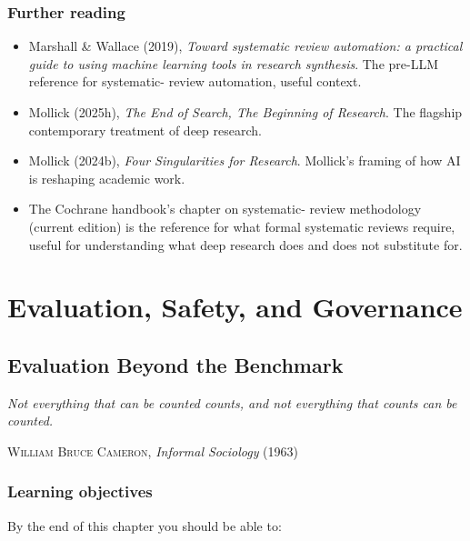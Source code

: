 \documentclass[
  letterpaper,
  11pt]{scrbook}
\providecommand{\tightlist}{%
  \setlength{\itemsep}{0pt}\setlength{\parskip}{0pt}}
\begin{document}
\section{Further reading}\label{further-reading-8}

\begin{itemize}
\tightlist
\item
  Marshall \& Wallace (2019), \emph{Toward systematic review automation:
  a practical guide to using machine learning tools in research
  synthesis}. The pre-LLM reference for systematic- review automation,
  useful context.
\item
  Mollick (2025h), \emph{The End of Search, The Beginning of Research}.
  The flagship contemporary treatment of deep research.
\item
  Mollick (2024b), \emph{Four Singularities for Research}. Mollick's
  framing of how AI is reshaping academic work.
\item
  The Cochrane handbook's chapter on systematic- review methodology
  (current edition) is the reference for what formal systematic reviews
  require, useful for understanding what deep research does and does not
  substitute for.
\end{itemize}

\part{Evaluation, Safety, and Governance}

\chapter{Evaluation Beyond the Benchmark}\label{sec-evaluation}

\begin{flushright}\small

\emph{Not everything that can be counted counts, and not everything that
counts can be counted.}

\textsc{William Bruce Cameron}, \emph{Informal Sociology} (1963)

\end{flushright}

\section{Learning objectives}\label{learning-objectives-9}

By the end of this chapter you should be able to:
\end{document}
